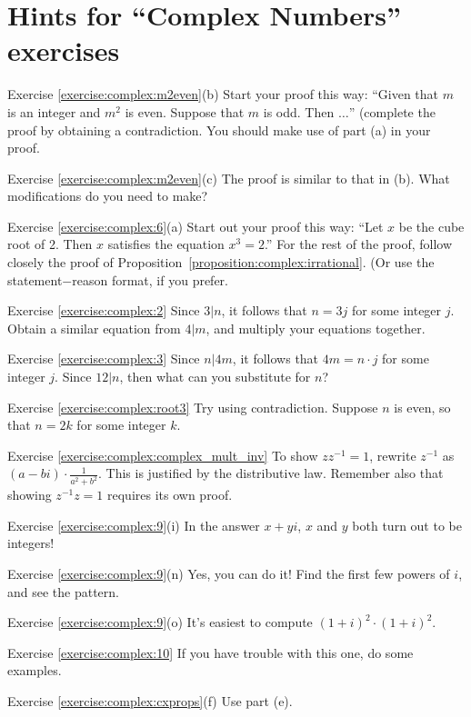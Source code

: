 \section{Hints for ``Complex Numbers'' exercises}\label{sec:complex:hints} 


\noindent Exercise \ref{exercise:complex:m2even}(b)
Start your proof this way: ``Given that $m$ is an integer and $m^2$ is even. Suppose that $m$ is odd. Then $\ldots$'' (complete the proof by obtaining a contradiction. You should make use of part (a) in your proof.

\noindent Exercise \ref{exercise:complex:m2even}(c)
The proof is similar to that in (b).  What modifications do you need to make?

\noindent Exercise \ref{exercise:complex:6}(a)
 Start out your proof this way: ``Let $x$ be the cube root of 2.  Then $x$ satisfies the equation $x^3 = 2$.'' For the rest of the proof, follow closely the proof of Proposition~\ref{proposition:complex:irrational}. (Or use the statement$-$reason format, if you prefer.

\noindent Exercise \ref{exercise:complex:2}
Since $3 | n$, it follows that $n=3j$ for some integer $j$. Obtain a similar equation from $4|m$, and multiply your equations together.


\noindent Exercise \ref{exercise:complex:3}
Since $n | 4m$, it follows that $4m=n\cdot j$ for some integer $j$. Since $12 | n$, then what can you substitute for $n$?

\noindent Exercise \ref{exercise:complex:root3}
Try using contradiction. Suppose $n$ is even, so that $n = 2k$ for some integer $k$.

\noindent Exercise \ref{exercise:complex:complex_mult_inv}
To show $zz^{-1}=1$, rewrite $z^{-1}$ as $(a-bi) \cdot \frac{1}{a^{2}+b^{2}}$. This is justified by the distributive law.  Remember also that showing $z^{-1}z=1$ requires its own proof.


\noindent Exercise \ref{exercise:complex:9}(i)
In the answer $x + yi$, $x$ and $y$ both turn out to be integers!

\noindent Exercise \ref{exercise:complex:9}(n)
Yes, you can do it! Find the first few powers of $i$, and see the pattern.

\noindent Exercise \ref{exercise:complex:9}(o)
It's easiest to compute $(1+i)^2 \cdot (1+i)^2$.

\noindent Exercise \ref{exercise:complex:10}
If you have trouble with this one, do some examples.

\noindent Exercise \ref{exercise:complex:cxprops}(f)
 Use part (e).

